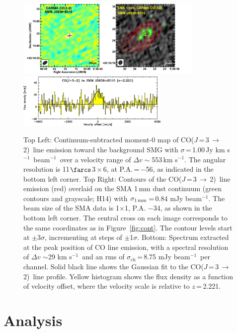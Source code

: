 \documentclass[twocolumn,apj,numberedappendix]{emulateapj}
\newcommand{\CO}{\mbox{CO($J$\,=\,3\,$\rightarrow$\,2) }}
\newcommand{\pmOne}{\mbox{$^{-1}$}}
\begin{document}
\begin{figure}[tbph] 
\centering
\includegraphics[width=0.8\textwidth]{Figure/LinePanel.pdf}
\includegraphics[width=0.65\textwidth]{Figure/smmj0939-co32_spec.eps}
\caption{Top Left: Continuum-subtracted moment-0 map of \CO line emission toward 
the background SMG with $\sigma$\,=\,1.00\,Jy\,\,km\,\,s\pmOne\ beam\pmOne\ over a velocity range of $\Delta v\sim$553\,km\,\,s\pmOne. The angular resolution is 11$\farcs$3\,$\times$\,6, at P.A.\,=\,$-$56\degr, as indicated in the bottom left corner. 
Top Right: Contours of the \CO line emission (red) overlaid on the SMA 1\,mm dust continuum (green contours and grayscale; H14) with $\sigma_\textrm{1\,mm}$\,=\,0.84 mJy beam\pmOne. The beam size of the SMA data is 1$ \times $1, P.A. $-$34\degr, as shown 
in the bottom left corner. 
The central cross on each image corresponds to the same coordinates as in Figure~\ref{fig:cont}. The contour levels start at $\pm$3$\sigma$, incrementing at
steps of $\pm$1$\sigma$. 
Bottom: 
Spectrum extracted at the peak position of CO line emission, with a spectral resolution of $\Delta v$ $\sim$29 km\,\,s\pmOne\, and an rms of $\sigma_\textrm{ch}$\,=\,8.75 mJy beam\pmOne\ per channel.
Solid black line shows the Gaussian fit to the \CO line profile. Yellow histogram shows the 
flux density as a function of velocity offset, where the velocity scale is relative to $z$\,=\,2.221. 
\label{fig:mom0}}
\end{figure}


\section{Analysis}
\end{document}
